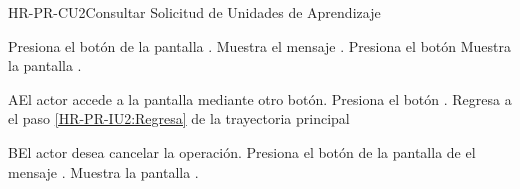 \begin{UseCase}{HR-PR-CU2}{Consultar Solicitud de Unidades de Aprendizaje}
\end{UseCase}


\begin{UCtrayectoria}
	\UCpaso [\UCactor] Presiona el botón  de la pantalla . 
	\UCpaso [\UCsist] Muestra el mensaje .
	\UCpaso [\UCactor] Presiona el botón  
	\UCpaso [\UCsist] Muestra la pantalla .\label{HR-PR-IU2:Regresa}
\end{UCtrayectoria}

\begin{UCtrayectoriaA}{A}{El actor accede a la pantalla mediante otro botón.}
	\UCpaso [\UCactor] Presiona el botón  .
	\UCpaso [\UCsist] Regresa a el paso \ref{HR-PR-IU2:Regresa} de la trayectoria principal
\end{UCtrayectoriaA} 

\begin{UCtrayectoriaA}{B}{El actor desea cancelar la operación.}
	\UCpaso [\UCactor] Presiona el botón  de la pantalla de el mensaje .
	\UCpaso [\UCsist] Muestra la pantalla . 
\end{UCtrayectoriaA} 



